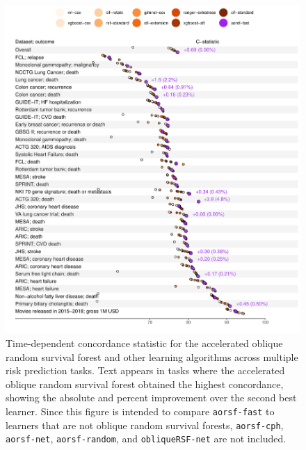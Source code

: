 \documentclass[twoside,11pt]{article}\usepackage[]{graphicx}\usepackage[]{xcolor}
\makeatletter
\def\maxwidth{ %
  \ifdim\Gin@nat@width>\linewidth
    \linewidth
  \else
    \Gin@nat@width
  \fi
}
\newenvironment{knitrout}{}{} %
\makeatother
\begin{document}
\begin{knitrout}
\color{fgcolor}\begin{figure}
\includegraphics[width=\maxwidth]{figure/bm_pred_viz_cstat-1} \caption[Time-dependent concordance statistic for the accelerated oblique random survival forest and other learning algorithms across multiple risk prediction tasks]{Time-dependent concordance statistic for the accelerated oblique random survival forest and other learning algorithms across multiple risk prediction tasks. Text appears in tasks where the accelerated oblique random survival forest obtained the highest concordance, showing the absolute and percent improvement over the second best learner. Since this figure is intended to compare \texttt{aorsf-fast} to learners that are not oblique random survival forests, \texttt{aorsf-cph}, \texttt{aorsf-net}, \texttt{aorsf-random}, and \texttt{obliqueRSF-net} are not included.}\label{fig:bm_pred_viz_cstat}
\end{figure}

\end{knitrout}
\end{document}
